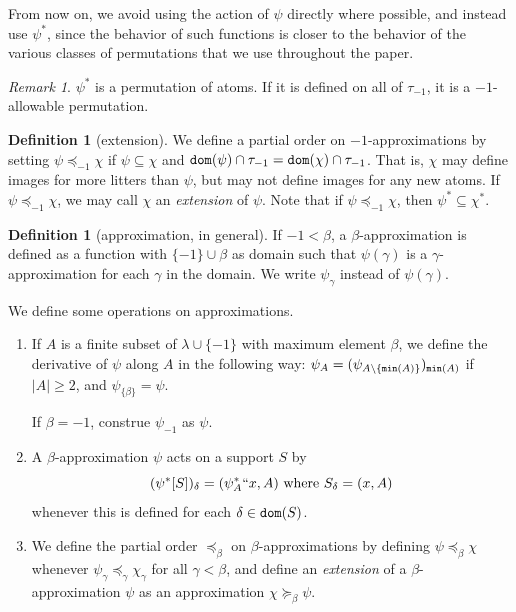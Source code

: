 \documentclass{article}
\theoremstyle{definition}
\newtheorem{definition}[theorem]{Definition}
\theoremstyle{remark}
\newtheorem{remark}[theorem]{Remark}
\begin{document}
{From now on, we avoid using the action of $\psi$ directly where possible, and instead use $\psi^*$, since the behavior of such functions is closer to the behavior of the various classes of permutations that we use throughout the paper.

\begin{remark}\label{rk:minus_one_approx_allowable}
  $\psi^*$ is a permutation of atoms.
  If it is defined on all of $\tau_{-1}$, it is a $-1$-allowable permutation.
\end{remark}
\begin{definition}[extension]
  We define a partial order on $-1$-approximations by setting $\psi \preceq_{-1} \chi$ if $\psi \subseteq \chi$ and ${\tt dom}(\psi) \cap \tau_{-1} = {\tt dom}(\chi) \cap \tau_{-1}$.
  That is, $\chi$ may define images for more litters than $\psi$, but may not define images for any new atoms.
  If $\psi \preceq_{-1} \chi$, we may call $\chi$ an {\em extension\/} of $\psi$.
  Note that if $\psi \preceq_{-1} \chi$, then $\psi^* \subseteq \chi^*$.
\end{definition}
\begin{definition}[approximation, in general]\label{def:approx}
  If $-1 < \beta$, a $\beta$-approximation is defined as a function with $\{-1\} \cup \beta$ as domain such that $\psi(\gamma)$ is a $\gamma$-approximation for each $\gamma$ in the domain.  We write $\psi_\gamma$ instead of $\psi(\gamma)$.

  We define some operations on approximations.
  \begin{enumerate}
    \item If $A$ is a finite subset of $\lambda\cup \{-1\}$ with maximum element $\beta$, we define the derivative of $\psi$ along $A$ in the following way: $\psi_A = (\psi_{A \setminus \{{\tt min}(A)\}})_{{\tt min}(A)}$ if $|A| \geq 2$, and $\psi_{\{\beta\}} = \psi$.

  If $\beta=-1$, construe $\psi_{-1}$ as $\psi$.

    \item A $\beta$-approximation $\psi$ acts on a support $S$ by
    $$ (\psi^*[S])_\delta = (\psi_A ^*`` x, A) \ \mathrm{where}\ S_\delta = (x, A) $$
    whenever this is defined for each $\delta \in {\tt dom}(S)$.
    \item We define the partial order $\preceq_\beta$ on $\beta$-approximations by defining $\psi \preceq_\beta \chi$ whenever $\psi_\gamma \preceq_\gamma \chi_\gamma$ for all $\gamma < \beta$, and define an {\em extension\/} of a $\beta$-approximation $\psi$ as an approximation $\chi \succeq_\beta \psi$.


\end{enumerate}
\end{definition}}
\end{document}
